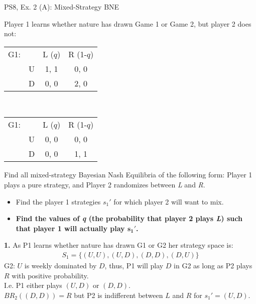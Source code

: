 \begin{frame}{PS8, Ex. 2 (A): Mixed-Strategy BNE}
    \begin{multicols}{2}
      Player 1 learns whether nature has drawn Game 1 or Game 2, but player 2 does not:
      \begin{table}
        \begin{tabular}{ll|c|c|}
          \multicolumn{1}{c}{G1:} & \multicolumn{1}{c}{} & \multicolumn{1}{c}{L ($q$)} & \multicolumn{1}{c}{R (1-$q$)} \\\cline{3-4}
          & U & 1, 1 & 0, 0 \\\cline{3-4}
          & D & 0, 0 & 2, 0 \\\cline{3-4}
        \end{tabular}\\\bigskip
        \begin{tabular}{ll|c|c|}
          \multicolumn{1}{c}{G1:} & \multicolumn{1}{c}{} & \multicolumn{1}{c}{L ($q$)} & \multicolumn{1}{c}{R (1-$q$)} \\\cline{3-4}
          & U & 0, 0 & 0, 0 \\\cline{3-4}
          & D & 0, 0 & 1, 1 \\\cline{3-4}
        \end{tabular}
      \end{table}
      Find all mixed-strategy Bayesian Nash Equilibria of the following form: Player 1 plays a pure strategy, and Player 2 randomizes between \textit{L} and \textit{R}.
      \begin{itemize}
        \item[Step 1:] Find the player 1 strategies $s_1'$ for which player 2 will want to mix.
        \item[Step 2:] \textbf{Find the values of \textit{q} (the probability that player 2 plays \textit{L}) such that player 1 will actually play $\bm{s_1'}$.}
      \end{itemize}
      \vfill\null\columnbreak
      \textbf{1.} As P1 learns whether nature has drawn G1 or G2 her strategy space is:
      \begin{align*}
        S_1=\{(U,U),(U,D),(D,D),(D,U)\}
      \end{align*}
      G2: $U$ is weekly dominated by $D$, thus, P1 will play $D$ in G2 as long as P2 plays $R$ with positive probability.\\\medskip I.e. P1 either plays $(U,D)$ or $(D,D)$.\\\medskip
      $BR_2((D,D))=R$ but P2 is indifferent between $L$ and $R$ for $s_1'=(U,D)$.
      \vfill\null
    \end{multicols}
\end{frame}
